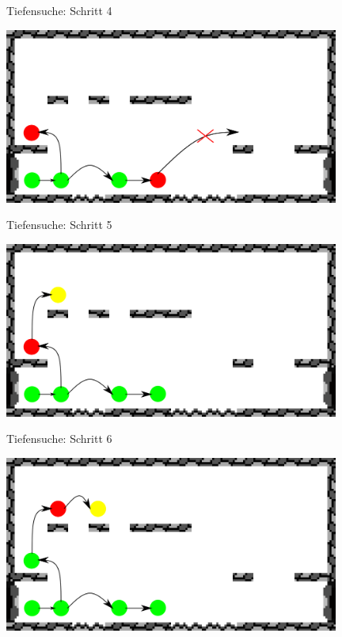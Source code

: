 \documentclass[fleqn]{beamer}
\begin{document}
    \begin{frame}{Tiefensuche: Schritt 4}
    		\begin{center}
    			\includegraphics[width=11cm]{Bilder/dfs4.png}
    		\end{center}
    \end{frame}
	\begin{frame}{Tiefensuche: Schritt 5}
    		\begin{center}
    			\includegraphics[width=11cm]{Bilder/dfs5.png}
    		\end{center}
    \end{frame}  
    \begin{frame}{Tiefensuche: Schritt 6}
    		\begin{center}
    			\includegraphics[width=11cm]{Bilder/dfs6.png}
    		\end{center}
    \end{frame}
\end{document}
